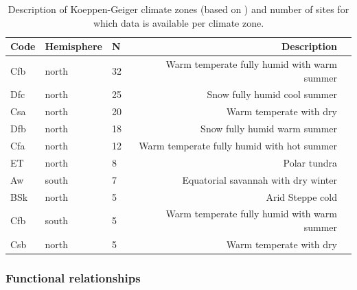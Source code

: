 \documentclass{myreport}
\begin{document}
\begin{table}
\caption{Description of Koeppen-Geiger climate zones (based on \cite{falge17}) and number of sites for which data is available per climate zone.} 
\centering
\begin{tabular}{lllrl}
  \toprule
  Code & Hemisphere & N & Description \\ 
  \midrule
   Cfb & north & 32 & Warm temperate fully humid with warm summer \\ 
   Dfc & north & 25 & Snow fully humid cool summer \\ 
   Csa & north & 20 & Warm temperate with dry \\ 
   Dfb & north & 18 & Snow fully humid warm summer \\ 
   Cfa & north & 12 & Warm temperate fully humid with hot summer \\ 
   ET & north & 8 & Polar tundra \\ 
   Aw & south & 7 & Equatorial savannah with dry winter \\ 
   BSk & north & 5 & Arid Steppe cold \\ 
   Cfb & south & 5 & Warm temperate fully humid with warm summer \\ 
   Csb & north & 5 & Warm temperate with dry \\ 
   \bottomrule
  \end{tabular}
  \label{tab:kgclimate}
\end{table}



\subsubsection{Functional relationships}
\label{sec:gam}
\end{document}
